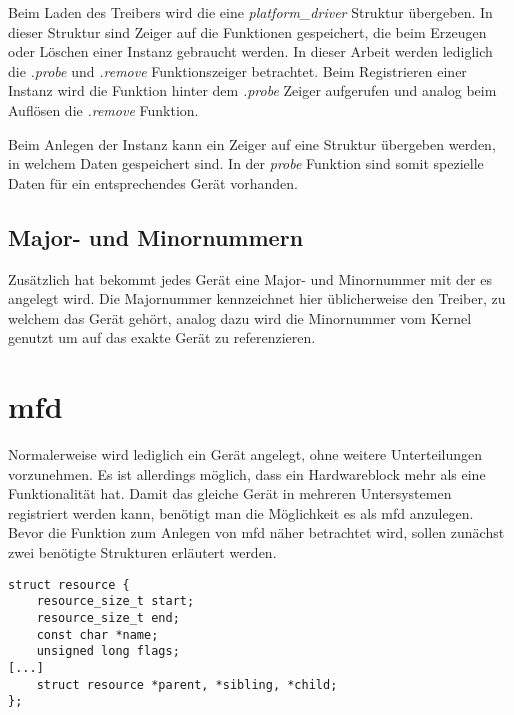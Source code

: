 Beim Laden des Treibers wird die eine \textit{platform\_driver} Struktur übergeben. In dieser Struktur sind Zeiger auf die Funktionen gespeichert, die beim Erzeugen oder Löschen einer Instanz gebraucht werden.  
In dieser Arbeit werden lediglich die \textit{.probe} und \textit{.remove} Funktionszeiger betrachtet. Beim Registrieren einer Instanz wird die Funktion hinter dem \textit{.probe} Zeiger aufgerufen und analog beim Auflösen die \textit{.remove} Funktion.\cite{corbetplatform} 

Beim Anlegen der Instanz kann ein Zeiger auf eine Struktur übergeben werden, in welchem Daten gespeichert sind. In der \textit{probe} Funktion sind somit spezielle Daten für ein entsprechendes Gerät vorhanden. \cite{corbetplatform} 

\subsection{Major- und Minornummern}\label{sec:mmnum_t}
Zusätzlich hat bekommt jedes Gerät eine Major- und Minornummer mit der es angelegt wird.
Die Majornummer kennzeichnet hier üblicherweise den Treiber, zu welchem das Gerät gehört, analog dazu wird die Minornummer vom Kernel genutzt um auf das exakte Gerät zu referenzieren. \citep[S. 43f]{corbet2005linux} 

\section{\acl{mfd}}\label{sec:mfd_t}
Normalerweise wird lediglich ein Gerät angelegt, ohne weitere Unterteilungen vorzunehmen. Es ist allerdings möglich, dass ein Hardwareblock mehr als eine Funktionalität hat. Damit das gleiche Gerät in mehreren Untersystemen registriert werden kann, benötigt man die Möglichkeit es als \ac{mfd} anzulegen. \cite{bellonimfd}\\

Bevor die Funktion zum Anlegen von \ac{mfd} näher betrachtet wird, sollen zunächst zwei benötigte Strukturen erläutert werden.

\begin{lstfloat}
\begin{lstlisting}
struct resource {
	resource_size_t start;
	resource_size_t end;
	const char *name;
	unsigned long flags;
[...]
	struct resource *parent, *sibling, *child;
};
\end{lstlisting}
\end{lstfloat}

